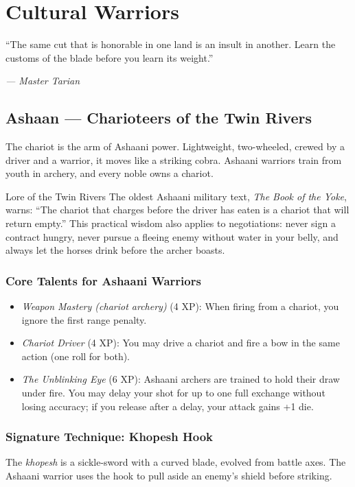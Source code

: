 \documentclass[9pt,a5paper]{extbook}
\begin{document}
\clearpage

\chapter{Cultural Warriors}
\epigraph{``The same cut that is honorable in one land is an insult in another. Learn the customs of the blade before you learn its weight.''}{\textit{--- Master Tarian}}

\section{Ashaan --- Charioteers of the Twin Rivers}

The chariot is the arm of Ashaani power. Lightweight, two-wheeled, crewed by a driver and a warrior, it moves like a striking cobra. Ashaani warriors train from youth in archery, and every noble owns a chariot.

\begin{warriorbox}{Lore of the Twin Rivers}
The oldest Ashaani military text, \textit{The Book of the Yoke}, warns: ``The chariot that charges before the driver has eaten is a chariot that will return empty.'' This practical wisdom also applies to negotiations: never sign a contract hungry, never pursue a fleeing enemy without water in your belly, and always let the horses drink before the archer boasts.
\end{warriorbox}

\subsection{Core Talents for Ashaani Warriors}
\begin{itemize}
    \item \textit{Weapon Mastery (chariot archery)} (4 XP): When firing from a chariot, you ignore the first range penalty.
    \item \textit{Chariot Driver} (4 XP): You may drive a chariot and fire a bow in the same action (one roll for both).
    \item \textit{The Unblinking Eye} (6 XP): Ashaani archers are trained to hold their draw under fire. You may delay your shot for up to one full exchange without losing accuracy; if you release after a delay, your attack gains +1 die.
\end{itemize}

\subsection{Signature Technique: Khopesh Hook}
The \textit{khopesh} is a sickle-sword with a curved blade, evolved from battle axes. The Ashaani warrior uses the hook to pull aside an enemy's shield before striking.
\end{document}
